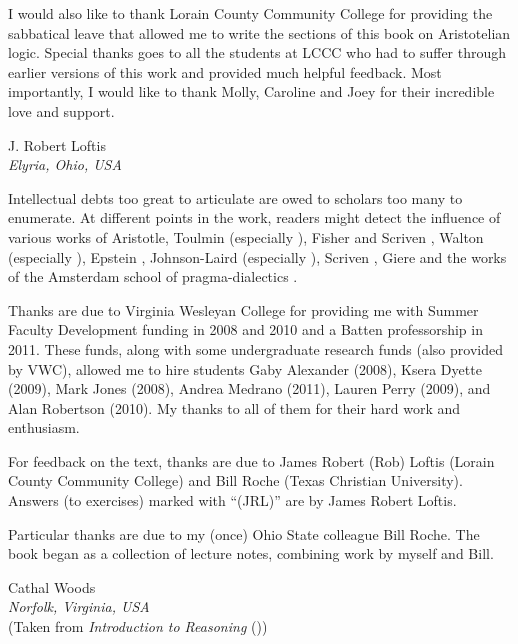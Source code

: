 I would also like to thank Lorain County Community College for providing the sabbatical leave that allowed me to write the sections of this book on Aristotelian logic. Special thanks goes to all the students at LCCC who had to suffer through earlier versions of this work and provided much helpful feedback. Most importantly, I would like to thank Molly, Caroline and Joey for their incredible love and support.

 \begin{adjustwidth}{2em}{0em}
 J. Robert Loftis \\
\noindent \emph{Elyria, Ohio, USA}
\end{adjustwidth}

\pagebreak


Intellectual debts too great to articulate are owed to scholars too many to enumerate. At different points in the work, readers might detect the influence of various works of Aristotle, Toulmin (especially \cite{Toulmin1958}), Fisher and Scriven \cite{Fisher1997}, Walton (especially \cite{Walton1996}), Epstein \cite{Epstein2002}, Johnson-Laird (especially \cite{johnson2006we}), Scriven \cite{Scriven1962}, Giere \cite{giere1997understanding} and the works of the Amsterdam school of pragma-dialectics \cite{van2002argumentation}.

Thanks are due to Virginia Wesleyan College for providing me with Summer Faculty Development funding in 2008 and 2010 and a Batten professorship in 2011. These funds, along with some undergraduate research funds (also provided by VWC), allowed me to hire students Gaby Alexander (2008), Ksera Dyette (2009), Mark Jones (2008), Andrea Medrano (2011), Lauren Perry (2009), and Alan Robertson (2010). My thanks to all of them for their hard work and enthusiasm.

For feedback on the text, thanks are due to James Robert (Rob) Loftis (Lorain County Community College) and Bill Roche (Texas Christian University). Answers (to exercises) marked with ``(JRL)'' are by James Robert Loftis.

Particular thanks are due to my (once) Ohio State colleague Bill Roche. The book began as a collection of lecture notes, combining work by myself and Bill.

\begin{adjustwidth}{2em}{0em}
Cathal Woods\\
\noindent\emph{Norfolk, Virginia, USA}\\
\noindent(Taken from \emph{Introduction to Reasoning} (\citeyear{Woods2014}))
\end{adjustwidth}


